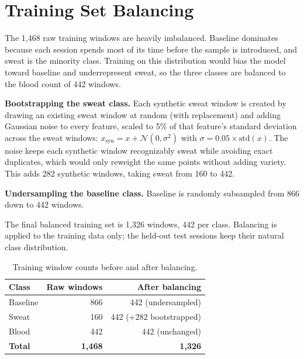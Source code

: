\documentclass[11pt]{article}
\begin{document}
\section*{Training Set Balancing}

The 1{,}468 raw training windows are heavily imbalanced. Baseline dominates because each
session spends most of its time before the sample is introduced, and sweat is the minority
class. Training on this distribution would bias the model toward baseline and
underrepresent sweat, so the three classes are balanced to the blood count of 442 windows.

\textbf{Bootstrapping the sweat class.} Each synthetic sweat window is created by drawing
an existing sweat window at random (with replacement) and adding Gaussian noise to every
feature, scaled to 5\% of that feature's standard deviation across the sweat windows:
$x_{\text{syn}} = x + \mathcal{N}(0, \sigma^2)$ with $\sigma = 0.05 \times \text{std}(x)$.
The noise keeps each synthetic window recognizably sweat while avoiding exact duplicates,
which would only reweight the same points without adding variety. This adds 282 synthetic
windows, taking sweat from 160 to 442.

\textbf{Undersampling the baseline class.} Baseline is randomly subsampled from 866 down
to 442 windows.

The final balanced training set is 1{,}326 windows, 442 per class. Balancing is applied to
the training data only; the held-out test sessions keep their natural class distribution.

\begin{table}[H]
\centering
\caption{Training window counts before and after balancing.}
\begin{tabular}{lrr}
    \toprule
    \textbf{Class} & \textbf{Raw windows} & \textbf{After balancing} \\
    \midrule
    Baseline & 866   & 442 \quad(undersampled) \\
    Sweat    & 160   & 442 \quad($+282$ bootstrapped) \\
    Blood    & 442   & 442 \quad(unchanged) \\
    \midrule
    \textbf{Total} & \textbf{1{,}468} & \textbf{1{,}326} \\
    \bottomrule
\end{tabular}
\end{table}

\end{document}
